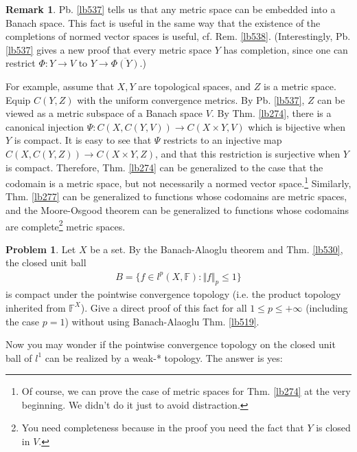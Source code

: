 \documentclass[12pt,b5paper,notitlepage]{article}
\theoremstyle{definition}
\newtheorem{rem}[df]{Remark}
\newtheorem{prob}{\color{red}Problem}[section]
\theoremstyle{plain}
\newcommand{\ovl}{\overline}
\newcommand{\Fbb}{\mathbb F}
\numberwithin{equation}{section}
\begin{document}
\begin{rem}
Pb. \ref{lb537} tells us that any metric space can be embedded into a Banach space. This fact is useful in the same way that the existence of the completions of normed vector spaces is useful, cf. Rem. \ref{lb538}. (Interestingly, Pb. \ref{lb537} gives a new proof that every metric space $Y$ has completion, since one can restrict $\Phi:Y\rightarrow V$ to $Y\rightarrow\ovl{\Phi(Y)}$.) 

For example, assume that $X,Y$ are topological spaces, and $Z$ is a metric space. Equip $C(Y,Z)$ with the uniform convergence metrics. By Pb. \ref{lb537}, $Z$ can be viewed as a metric subspace of a Banach space $V$. By Thm. \ref{lb274}, there is a canonical injection $\Psi:C(X,C(Y,V))\rightarrow C(X\times Y,V)$ which is bijective when $Y$ is compact. It is easy to see that $\Psi$ restricts to an injective map $C(X,C(Y,Z))\rightarrow C(X\times Y,Z)$, and that this restriction is surjective when $Y$ is compact. Therefore, Thm. \ref{lb274} can be generalized to the case that the codomain is a metric space, but not necessarily a normed vector space.\footnote{Of course, we can prove the case of metric spaces for Thm. \ref{lb274} at the very beginning. We didn't do it just to avoid distraction.} Similarly, Thm. \ref{lb277} can be generalized to functions whose codomains are metric spaces, and the Moore-Osgood theorem can be generalized to functions whose codomains are complete\footnote{You need completeness because in the proof you need the fact that $Y$ is closed in $V$.} metric spaces.   \hfill\qedsymbol
\end{rem}








\begin{prob}\label{lb531}
Let $X$ be a set. By the Banach-Alaoglu theorem and Thm. \ref{lb530}, the closed unit ball
\begin{align}
B=\{f\in l^p(X,\Fbb):\Vert f\Vert_p\leq 1\}
\end{align}
is compact under the pointwise convergence topology (i.e. the product topology inherited from $\Fbb^X$). Give a direct proof of this fact for all $1\leq p\leq +\infty$ (including the case $p=1$) without using Banach-Alaoglu Thm. \ref{lb519}.
\end{prob}


Now you may wonder if the pointwise convergence topology on the closed unit ball of $l^1$ can be realized by a weak-* topology. The answer is yes:
\end{document}
